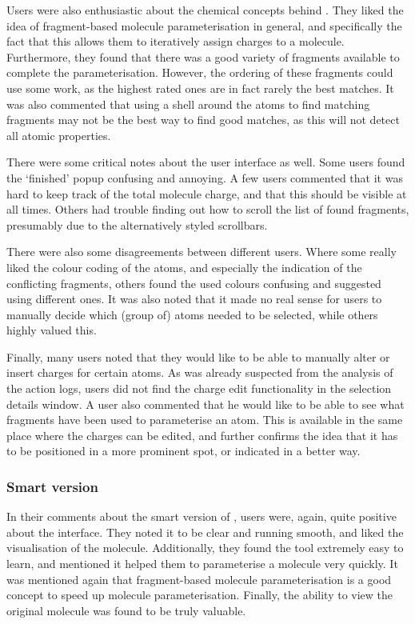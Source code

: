 Users were also enthusiastic about the chemical concepts behind \oframp. They liked the idea of fragment-based molecule parameterisation in general, and specifically the fact that this allows them to iteratively assign charges to a molecule. Furthermore, they found that there was a good variety of fragments available to complete the parameterisation. However, the ordering of these fragments could use some work, as the highest rated ones are in fact rarely the best matches. It was also commented that using a shell around the atoms to find matching fragments may not be the best way to find good matches, as this will not detect all atomic properties.


There were some critical notes about the user interface as well. Some users found the `finished' popup confusing and annoying. A few users commented that it was hard to keep track of the total molecule charge, and that this should be visible at all times. Others had trouble finding out how to scroll the list of found fragments, presumably due to the alternatively styled scrollbars.

There were also some disagreements between different users. Where some really liked the colour coding of the atoms, and especially the indication of the conflicting fragments, others found the used colours confusing and suggested using different ones. It was also noted that it made no real sense for users to manually decide which (group of) atoms needed to be selected, while others highly valued this.

Finally, many users noted that they would like to be able to manually alter or insert charges for certain atoms. As was already suspected from the analysis of the action logs, users did not find the charge edit functionality in the selection details window. A user also commented that he would like to be able to see what fragments have been  used to parameterise an atom. This is available in the same place where the charges can be edited, and further confirms the idea that it has to be positioned in a more prominent spot, or indicated in a better way.


\subsubsection{Smart version}
In their comments about the smart version of \oframp, users were, again, quite positive about the interface. They noted it to be clear and running smooth, and liked the visualisation of the molecule. Additionally, they found the tool extremely easy to learn, and mentioned it helped them to parameterise a molecule very quickly. It was mentioned again that fragment-based molecule parameterisation is a good concept to speed up molecule parameterisation. Finally, the ability to view the original molecule was found to be truly valuable.

